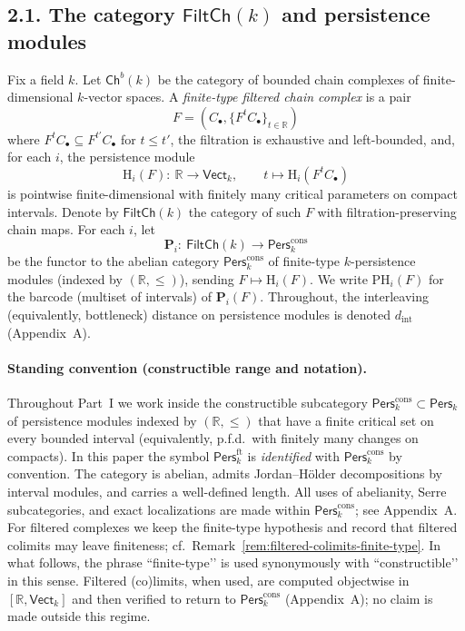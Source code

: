 \documentclass[11pt]{article}
\newcommand{\Pers}{\mathsf{Pers}}
\numberwithin{equation}{section}
\theoremstyle{definition}
\begin{document}
\subsection*{2.1. The category \texorpdfstring{$\mathsf{FiltCh}(k)$}{FiltCh(k)} and persistence modules}
Fix a field \(k\). Let \(\mathsf{Ch}^{b}(k)\) be the category of bounded chain complexes of finite-dimensional \(k\)-vector spaces. A \emph{finite-type filtered chain complex} is a pair
\[
F=(C_\bullet,\{F^{t}C_\bullet\}_{t\in\mathbb{R}})
\]
where \(F^{t}C_\bullet\subseteq F^{t'}C_\bullet\) for \(t\le t'\), the filtration is exhaustive and left-bounded, and, for each \(i\), the persistence module
\[
\mathrm{H}_i(F):\ \mathbb{R}\longrightarrow \mathsf{Vect}_k,\qquad t\longmapsto \mathrm{H}_i(F^{t}C_\bullet)
\]
is pointwise finite-dimensional with finitely many critical parameters on compact intervals. Denote by \(\mathsf{FiltCh}(k)\) the category of such \(F\) with filtration-preserving chain maps. For each \(i\), let
\[
\mathbf{P}_i:\ \mathsf{FiltCh}(k)\longrightarrow \Pers^{\mathrm{cons}}_k
\]
be the functor to the abelian category \(\Pers^{\mathrm{cons}}_k\) of finite-type \(k\)-persistence modules (indexed by \((\mathbb{R},\le)\)), sending \(F\mapsto \mathrm{H}_i(F)\). We write \(\mathrm{PH}_i(F)\) for the barcode (multiset of intervals) of \(\mathbf{P}_i(F)\). Throughout, the interleaving (equivalently, bottleneck) distance on persistence modules is denoted \(d_{\mathrm{int}}\) (Appendix~A).

\paragraph{Standing convention (constructible range and notation).}
Throughout Part~I we work inside the constructible subcategory
\(\Pers^{\mathrm{cons}}_k\subset\Pers_k\) of persistence modules indexed by \((\mathbb{R},\le)\)
that have a finite critical set on every bounded interval (equivalently, p.f.d.\ with finitely many changes on compacts).
In this paper the symbol \(\Pers^{\mathrm{ft}}_k\) is \emph{identified} with \(\Pers^{\mathrm{cons}}_k\) by convention.
The category is abelian, admits Jordan–Hölder decompositions by interval modules, and carries a well-defined length.
All uses of abelianity, Serre subcategories, and exact localizations are made within \(\Pers^{\mathrm{cons}}_k\); see Appendix~A.
For filtered complexes we keep the finite-type hypothesis and record that filtered colimits may leave finiteness; cf.\ Remark~\ref{rem:filtered-colimits-finite-type}.
In what follows, the phrase “finite-type’’ is used synonymously with “constructible’’ in this sense.
Filtered (co)limits, when used, are computed objectwise in \([\mathbb{R},\mathsf{Vect}_k]\) and then verified to return to \(\Pers^{\mathrm{cons}}_k\) (Appendix~A); no claim is made outside this regime.
\end{document}

